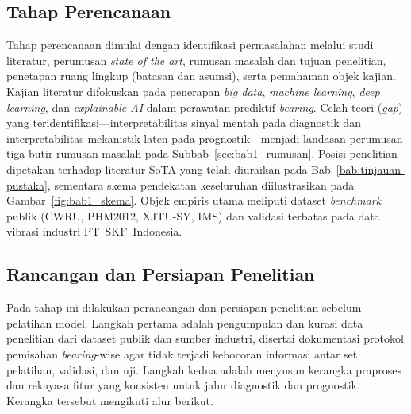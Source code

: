{\color{blue}
\subsection{Tahap Perencanaan}
\label{subsec:bab1_tahap_perencanaan}

Tahap perencanaan dimulai dengan identifikasi permasalahan melalui studi
literatur, perumusan \emph{state of the art}, rumusan masalah dan tujuan
penelitian, penetapan ruang lingkup (batasan dan asumsi), serta
pemahaman objek kajian.
Kajian literatur difokuskan pada penerapan \emph{big data}, \emph{machine
learning}, \emph{deep learning}, dan \emph{explainable AI} dalam
perawatan prediktif \emph{bearing}.
Celah teori (\emph{gap}) yang teridentifikasi---interpretabilitas sinyal
mentah pada diagnostik dan interpretabilitas mekanistik laten pada
prognostik---menjadi landasan perumusan tiga butir rumusan masalah pada
Subbab~\ref{sec:bab1_rumusan}.
Posisi penelitian dipetakan terhadap literatur SoTA yang telah diuraikan
pada Bab~\ref{bab:tinjauan-pustaka}, sementara skema pendekatan keseluruhan
diilustrasikan pada Gambar~\ref{fig:bab1_skema}.
Objek empiris utama meliputi dataset \emph{benchmark} publik (CWRU,
PHM2012, XJTU-SY, IMS) dan validasi terbatas pada data vibrasi industri
PT~SKF~Indonesia.

\subsection{Rancangan dan Persiapan Penelitian}
\label{subsec:bab1_rancangan_persiapan}

Pada tahap ini dilakukan perancangan dan persiapan penelitian sebelum
pelatihan model.
Langkah pertama adalah pengumpulan dan kurasi data penelitian dari
dataset publik dan sumber industri, disertai dokumentasi protokol
pemisahan \emph{bearing}-wise agar tidak terjadi kebocoran informasi
antar set pelatihan, validasi, dan uji.
Langkah kedua adalah menyusun kerangka praproses dan rekayasa fitur yang
konsisten untuk jalur diagnostik dan prognostik.
Kerangka tersebut mengikuti alur berikut.
}

